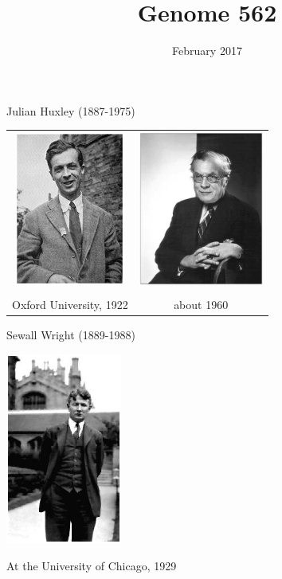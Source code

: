 \documentclass[bluish,slideColor,colorBG,pdf]{prosper}
\author{February 2017}
\title{Genome 562}
\begin{document}
\maketitle

\begin{slide}[Replace]{Julian Huxley (1887-1975) }
\bigskip

\begin{center}
\begin{tabular}{c c}
\includegraphics[height=2.0in]{Huxley1922.ps} &
\includegraphics[height=2.0in]{huxleyj.ps}\\
 & \\
Oxford University, 1922 & about 1960 
\end{tabular}
\end{center}
\end{slide}

\begin{slide}[Replace]{Sewall Wright (1889-1988) }

\centerline{\includegraphics[width=1.5in]{wright.ps}}
\medskip

\centerline{At the University of Chicago, 1929}

\end{slide}
\end{document}
